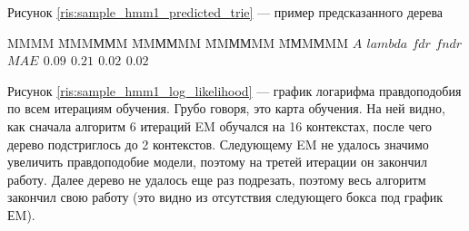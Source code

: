 \documentclass{matmex-diploma-custom}
\begin{document}
Рисунок \ref{ris:sample_hmm1_predicted_trie} --- пример предсказанного дерева
\begin{tabbing}
MMMM \= MMMММM \= MMММMM \= MMММMM \= MМMМMM \kill
\bf{}  \> {\bf $\textit{A}$} \> {\bf $\textit{lambda}$} \> {\bf $\textit{fdr}$} \> {\bf $\textit{fndr}$} \\ 
$\textit{MAE}$ \> $0.09$ \> $0.21$ \> $0.02$ \> $0.02$ \
\end{tabbing} 

Рисунок \ref{ris:sample_hmm1_log_likelihood} --- график логарифма правдоподобия по всем итерациям обучения. Грубо говоря, это карта обучения. На ней видно, как сначала алгоритм 6 итераций EM обучался на 16 контекстах, после чего дерево подстриглось до 2 контекстов. Следующему EM не удалось значимо увеличить правдоподобие модели, поэтому на третей итерации он закончил работу. Далее дерево не удалось еще раз подрезать, поэтому весь алгоритм закончил свою работу (это видно из отсутствия следующего бокса под график ЕM).
\end{document}
